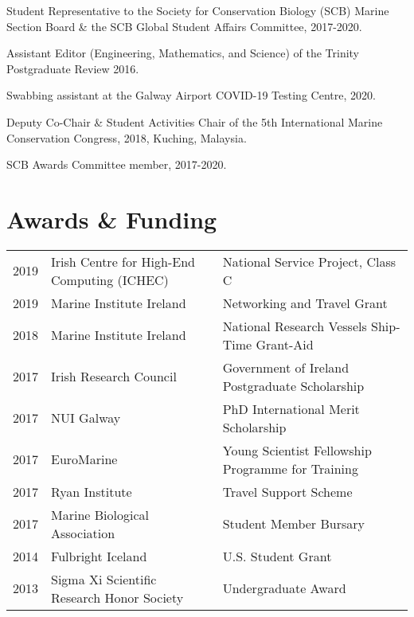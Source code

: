 \documentclass[a4paper]{deedy-resume} %
\begin{document}
\begin{flushleft}
\begin{tightitemize}
\item Student Representative to the Society for Conservation Biology (SCB) Marine Section Board \& the SCB Global Student Affairs Committee, 2017-2020. 
\item Assistant Editor (Engineering, Mathematics, and Science) of the Trinity Postgraduate Review 2016.
\end{tightitemize}

\sectionspace

\begin{tightitemize}
\item Swabbing assistant at the Galway Airport COVID-19 Testing Centre, 2020.
\item Deputy Co-Chair \& Student Activities Chair of the 5th International Marine Conservation Congress, 2018, Kuching, Malaysia.
\item SCB Awards Committee member, 2017-2020.
\end{tightitemize}

\sectionspace




\section{Awards \& Funding}

\begin{tabular}{ l l l }
2019 & Irish Centre for High-End Computing (ICHEC) & National Service Project, Class C \\
2019 & Marine Institute Ireland & Networking and Travel Grant \\
2018 & Marine Institute Ireland & National Research Vessels Ship-Time Grant-Aid \\
2017 & Irish Research Council & Government of Ireland Postgraduate Scholarship \\
2017 & NUI Galway & PhD International Merit Scholarship \\
2017 & EuroMarine & Young Scientist Fellowship Programme for Training \\
2017 & Ryan Institute & Travel Support Scheme \\
2017 & Marine Biological Association & Student Member Bursary \\
2014 & Fulbright Iceland & U.S. Student Grant \\
2013 & Sigma Xi Scientific Research Honor Society & Undergraduate Award


\end{tabular}
\end{flushleft}
\end{document}
